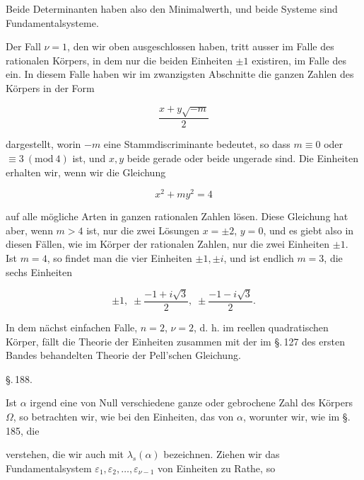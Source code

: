 Beide Determinanten haben also den Minimalwerth, und
beide Systeme sind Fundamentalsysteme.

Der Fall $\nu = 1$, den wir oben ausgeschlossen haben, tritt
ausser im Falle des rationalen Körpers, in dem nur die beiden
Einheiten $\pm 1$ existiren, im Falle des  ein. In diesem Falle haben wir im zwanzigsten
 Abschnitte die ganzen Zahlen des Körpers in der Form

\[
\frac{x + y\sqrt{-m}}{2}
\]

dargestellt, worin $-m$ eine Stammdiscriminante bedeutet, so
dass $m \equiv 0$ oder $\equiv 3\ (\mathrm{mod}\ 4)$ ist, und $x, y$ beide gerade oder
beide ungerade sind. Die Einheiten erhalten wir, wenn wir die
Gleichung

\[
x^2 + m y^2 = 4
\]

auf alle mögliche Arten in ganzen rationalen Zahlen lösen. Diese
Gleichung hat aber, wenn $m > 4$ ist, nur die zwei Lösungen
$x = \pm 2$, $y = 0$, und es giebt also in diesen Fällen, wie im
Körper der rationalen Zahlen, nur die zwei Einheiten $\pm 1$. Ist
$m = 4$, so findet man die vier Einheiten $\pm 1, \pm i$, und ist endlich
 $m = 3$, die sechs Einheiten

\[
\pm 1, \; \pm \frac{-1 + i\sqrt{3}}{2}, \; \pm \frac{-1 - i\sqrt{3}}{2}.
\]

In dem nächst einfachen Falle, $n = 2$, $\nu = 2$, d. h. im
reellen quadratischen Körper, fällt die Theorie der Einheiten
zusammen mit der im \S.\,127 des ersten Bandes behandelten
Theorie der Pell'schen Gleichung.

\begin{center}
\S.\,188.\\[4pt]
\end{center}

Ist $\alpha$ irgend eine von Null verschiedene ganze oder gebrochene
 Zahl des Körpers $\Omega$, so betrachten wir, wie bei den
Einheiten, das  von $\alpha$,
worunter wir, wie im \S.\,185, die 


verstehen, die wir auch mit $\lambda_s(\alpha)$ bezeichnen. Ziehen wir das
Fundamentalsystem $\varepsilon_1, \varepsilon_2, \ldots, \varepsilon_{\nu-1}$ von Einheiten zu Rathe, so
